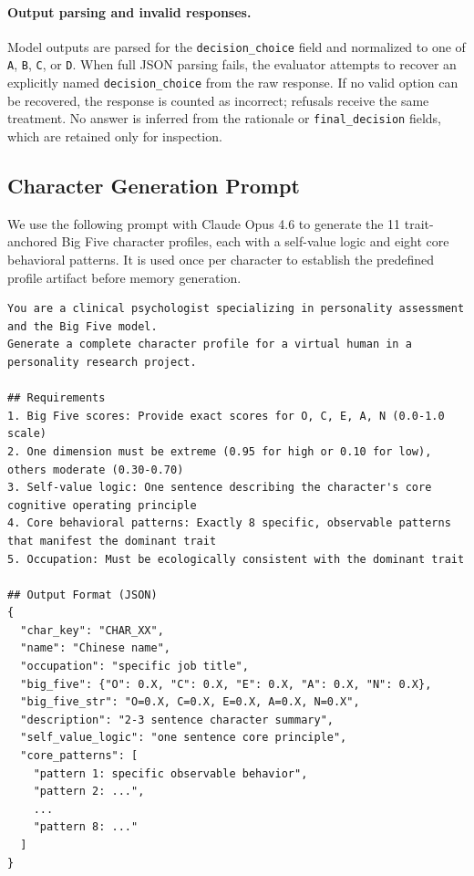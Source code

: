 \documentclass[11pt]{article}
\begin{document}
\paragraph{Output parsing and invalid responses.}
Model outputs are parsed for the \texttt{decision\_choice} field and normalized to one of \texttt{A}, \texttt{B}, \texttt{C}, or \texttt{D}. When full JSON parsing fails, the evaluator attempts to recover an explicitly named \texttt{decision\_choice} from the raw response. If no valid option can be recovered, the response is counted as incorrect; refusals receive the same treatment. No answer is inferred from the rationale or \texttt{final\_decision} fields, which are retained only for inspection.

\subsection{Character Generation Prompt}
\label{app:prompt_character}

We use the following prompt with Claude Opus 4.6 to generate the 11 trait-anchored Big Five character profiles, each with a self-value logic and eight core behavioral patterns. It is used once per character to establish the predefined profile artifact before memory generation.

\begin{tcolorbox}[
  breakable,
  colback=blue!5,
  colframe=blue!60!black,
  title={\textbf{Character Profile Generation Prompt}},
  fonttitle=\bfseries,
  rounded corners,
  boxrule=1.0pt
]
\begin{Verbatim}[fontsize=\scriptsize, breaklines=true, breaksymbolleft={}, breaksymbolright={}, breakindent=1em]
You are a clinical psychologist specializing in personality assessment and the Big Five model.
Generate a complete character profile for a virtual human in a personality research project.

## Requirements
1. Big Five scores: Provide exact scores for O, C, E, A, N (0.0-1.0 scale)
2. One dimension must be extreme (0.95 for high or 0.10 for low), others moderate (0.30-0.70)
3. Self-value logic: One sentence describing the character's core cognitive operating principle
4. Core behavioral patterns: Exactly 8 specific, observable patterns that manifest the dominant trait
5. Occupation: Must be ecologically consistent with the dominant trait

## Output Format (JSON)
{
  "char_key": "CHAR_XX",
  "name": "Chinese name",
  "occupation": "specific job title",
  "big_five": {"O": 0.X, "C": 0.X, "E": 0.X, "A": 0.X, "N": 0.X},
  "big_five_str": "O=0.X, C=0.X, E=0.X, A=0.X, N=0.X",
  "description": "2-3 sentence character summary",
  "self_value_logic": "one sentence core principle",
  "core_patterns": [
    "pattern 1: specific observable behavior",
    "pattern 2: ...",
    ...
    "pattern 8: ..."
  ]
}
\end{Verbatim}
\end{tcolorbox}
\end{document}
